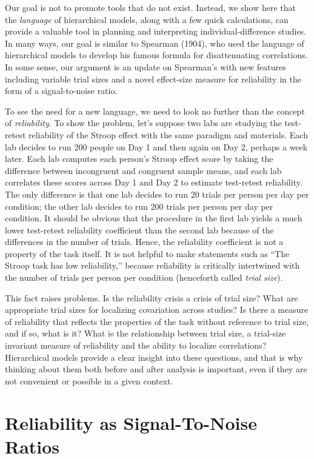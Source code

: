 \documentclass[
  ,man]{apa6}
\begin{document}
Our goal is not to promote tools that do not exist. Instead, we show here that the \emph{language} of hierarchical models, along with a few quick calculations, can provide a valuable tool in planning and interpreting individual-difference studies. In many ways, our goal is similar to Spearman (1904), who used the language of hierarchical models to develop his famous formula for disattenuating correlations. In some sense, our argument is an update on Spearman's with new features including variable trial sizes and a novel effect-size measure for reliability in the form of a signal-to-noise ratio.

To see the need for a new language, we need to look no further than the concept of \emph{reliability}. To show the problem, let's suppose two labs are studying the test-retest reliability of the Stroop effect with the same paradigm and materials. Each lab decides to run 200 people on Day 1 and then again on Day 2, perhaps a week later. Each lab computes each person's Stroop effect score by taking the difference between incongruent and congruent sample means, and each lab correlates these scores across Day 1 and Day 2 to estimate test-retest reliability. The only difference is that one lab decides to run 20 trials per person per day per condition; the other lab decides to run 200 trials per person per day per condition. It should be obvious that the procedure in the first lab yields a much lower test-retest reliability coefficient than the second lab because of the differences in the number of trials. Hence, the reliability coefficient is not a property of the task itself. It is not helpful to make statements such as ``The Stroop task has low reliability,'' because reliability is critically intertwined with the number of trials per person per condition (henceforth called \emph{trial size}).

This fact raises problems. Is the reliability crisis a crisis of trial size? What are appropriate trial sizes for localizing covariation across studies? Is there a measure of reliability that reflects the properties of the task without reference to trial size, and if so, what is it? What is the relationship between trial size, a trial-size invariant measure of reliability and the ability to localize correlations? Hierarchical models provide a clear insight into these questions, and that is why thinking about them both before and after analysis is important, even if they are not convenient or possible in a given context.

\hypertarget{reliability-as-signal-to-noise-ratios}{%
\section{Reliability as Signal-To-Noise Ratios}\label{reliability-as-signal-to-noise-ratios}}
\end{document}
